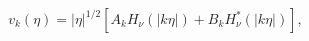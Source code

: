 \begin{equation}\label{eq:solution}
v_k(\eta)=|\eta|^{1/2}\left[A_k H_\nu(|k \eta|)
  +B_k H^*_\nu(|k\eta|)\right],
\end{equation} 

